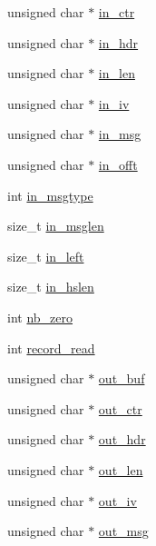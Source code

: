 \begin{DoxyCompactItemize}
unsigned char $\ast$ \hyperlink{structmbedtls__ssl__context_ab53517e77417e69419985902a528cc6a}{in\+\_\+ctr}
\item 
unsigned char $\ast$ \hyperlink{structmbedtls__ssl__context_ac1d0542cf430db2fb4b2855afc29fd5e}{in\+\_\+hdr}
\item 
unsigned char $\ast$ \hyperlink{structmbedtls__ssl__context_af7235ac32f8a336a7636c63af6ef2127}{in\+\_\+len}
\item 
unsigned char $\ast$ \hyperlink{structmbedtls__ssl__context_a77217f5c44f1ad2518a873030278628d}{in\+\_\+iv}
\item 
unsigned char $\ast$ \hyperlink{structmbedtls__ssl__context_a9c55d8cac2040048e56a6a2a694375c8}{in\+\_\+msg}
\item 
unsigned char $\ast$ \hyperlink{structmbedtls__ssl__context_af07148a2eb35b01d63b3f6d9b59e58df}{in\+\_\+offt}
\item 
int \hyperlink{structmbedtls__ssl__context_aa2283450c4e546808af09c943f115780}{in\+\_\+msgtype}
\item 
size\+\_\+t \hyperlink{structmbedtls__ssl__context_adfee31e1e5269ab17d1df707025df30a}{in\+\_\+msglen}
\item 
size\+\_\+t \hyperlink{structmbedtls__ssl__context_ae989f555c14b7c6286d7a4616860cb24}{in\+\_\+left}
\item 
size\+\_\+t \hyperlink{structmbedtls__ssl__context_a8fa1f7b5ff4c594a3880e256a4044399}{in\+\_\+hslen}
\item 
int \hyperlink{structmbedtls__ssl__context_a4b988651d1c7320f119d3d80f9af7d94}{nb\+\_\+zero}
\item 
int \hyperlink{structmbedtls__ssl__context_adfba71d6f510182482d73cd8f1ffbccd}{record\+\_\+read}
\item 
unsigned char $\ast$ \hyperlink{structmbedtls__ssl__context_a77df97cbed2923f1162034c6e9c2ad4d}{out\+\_\+buf}
\item 
unsigned char $\ast$ \hyperlink{structmbedtls__ssl__context_aa738cee1fd289e5c8686ab355d591203}{out\+\_\+ctr}
\item 
unsigned char $\ast$ \hyperlink{structmbedtls__ssl__context_a02d820fa0a4f09e5b5a69b71de4cc125}{out\+\_\+hdr}
\item 
unsigned char $\ast$ \hyperlink{structmbedtls__ssl__context_a492e5b5ecc58e0f68c7498eaa07fc273}{out\+\_\+len}
\item 
unsigned char $\ast$ \hyperlink{structmbedtls__ssl__context_ab2e382571a395990024d82a47dadf565}{out\+\_\+iv}
\item 
unsigned char $\ast$ \hyperlink{structmbedtls__ssl__context_a6398baeb1222e1b166531b8528800a20}{out\+\_\+msg}

\end{DoxyCompactItemize}
